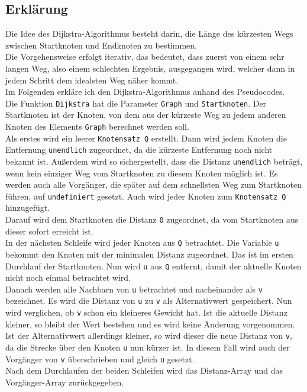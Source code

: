 \documentclass[12pt]{article}
\def\code#1{\texttt{#1}}
\begin{document}
	\subsection{Erklärung}
		Die Idee des Dijkstra-Algorithmus besteht darin, die Länge des kürzesten Wegs zwischen Startknoten und Endknoten zu bestimmen.\\
		Die Vorgehensweise erfolgt iterativ, das bedeutet, dass zuerst von einem sehr langen Weg, also einem schlechten Ergebnis, ausgegangen wird, welcher dann in jedem Schritt dem idealsten Weg näher kommt.\\
		Im Folgenden erkläre ich den Dijkstra-Algorithmus anhand des Pseudocodes.\\
		Die Funktion \code{Dijkstra} hat die Parameter \code{Graph} und \code{Startknoten}. Der Startknoten ist der Knoten, von dem aus der kürzeste Weg zu jedem anderen Knoten des Elements \code{Graph} berechnet werden soll.\\
		Als erstes wird ein leerer \code{Knotensatz Q} erstellt.
		Dann wird jedem Knoten die Entfernung \code{unendlich} zugeordnet, da die kürzeste Entfernung noch nicht bekannt ist. Außerdem wird so sichergestellt, dass die Distanz \code{unendlich} beträgt, wenn kein einziger Weg vom Startknoten zu diesem Knoten möglich ist.
		Es werden auch alle Vorgänger, die später auf dem schnellsten Weg zum Startknoten führen, auf \code{undefiniert} gesetzt.
		Auch wird jeder Knoten zum \code{Knotensatz Q} hinzugefügt.\\
		Darauf wird dem Startknoten die Distanz \code{0} zugeordnet, da vom Startknoten aus dieser sofort erreicht ist.\\
		In der nächsten Schleife wird jeder Knoten aus \code{Q} betrachtet. Die Variable \code{u} bekommt den Knoten mit der minimalen Distanz zugeordnet. Das ist im ersten Durchlauf der Startknoten. Nun wird \code{u} aus \code{Q} entfernt, damit der aktuelle Knoten nicht noch einmal betrachtet wird.\\
		Danach werden alle Nachbarn von \code{u} betrachtet und nacheinander als \code{v} bezeichnet. Es wird die Distanz von \code{u} zu \code{v} als Alternativwert gespeichert. Nun wird verglichen, ob \code{v} schon ein kleineres Gewicht hat. Ist die aktuelle Distanz kleiner, so bleibt der Wert bestehen und es wird keine Änderung vorgenommen. Ist der Alternativwert allerdings kleiner, so wird dieser die neue Distanz von \code{v}, da die Strecke über den Knoten \code{u} nun kürzer ist. In diesem Fall wird auch der Vorgänger von \code{v} überschrieben und gleich \code{u} gesetzt.\\
		Nach dem Durchlaufen der beiden Schleifen wird das Distanz-Array und das Vorgänger-Array zurückgegeben.
	
\end{document}
